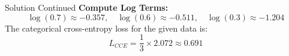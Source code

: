 \documentclass[serif, aspectratio=169]{beamer}
\begin{document}
\begin{frame}{Solution Continued}
    \textbf{Compute Log Terms:}
    \[
    \log(0.7) \approx -0.357, \quad \log(0.6) \approx -0.511, \quad \log(0.3) \approx -1.204
    \]
        The categorical cross-entropy loss for the given data is:
    \[
    L_{CCE} = \frac{1}{3} \times 2.072 \approx 0.691
    \]
\end{frame}

    







\end{document}
